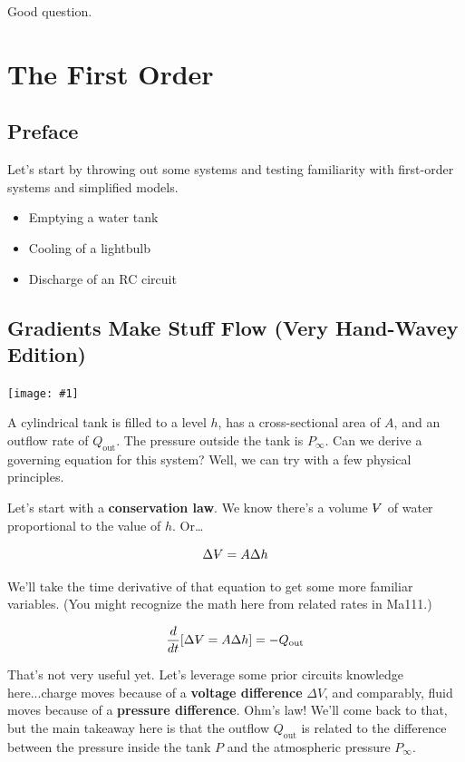 \documentclass{report}
\newcommand{\Volume}{{\ooalign{\hfil$V$\hfil\cr\kern0.08em--\hfil\cr}}}
\newcommand{\bicture}[1]{
\begin{center}
    {\texttt{[image: \#1]}}
\end{center}}
\begin{document}
\begin{onehalfspacing}
\begin{flushleft}
Good question.

\pagebreak

\chapter{The First Order}

\section*{Preface}

Let's start by throwing out some systems and testing familiarity with first-order systems and simplified models.
\begin{itemize}[noitemsep,topsep=0.5pt]
    \item Emptying a water tank
    \item Cooling of a lightbulb
    \item Discharge of an RC circuit
\end{itemize}

\section{Gradients Make Stuff Flow (Very Hand-Wavey Edition)}

\bicture{1_sys1}

A cylindrical tank is filled to a level \(h\), has a cross-sectional area of \(A\), and an outflow rate of \(Q_\text{out}\). The pressure outside the tank is \(P_{\infty}\). Can we derive a governing equation for this system? Well, we can try with a few physical principles.

\medskip

Let's start with a \textbf{conservation law}. We know there's a volume \(\Volume\) of water proportional to the value of \(h\). Or\dots

\vspace{-0.1in}
\[\Delta \Volume = A \Delta h\]

We'll take the time derivative of that equation to get some more familiar variables. (You might recognize the math here from related rates in Ma111.)

\vspace{-0.1in}
\[\frac{d}{dt} \qty[\Delta \Volume = A \Delta h] = -Q_\text{out}\]

That's not very useful yet. Let's leverage some prior circuits knowledge here...charge moves because of a \textbf{voltage difference} \(\Delta V\), and comparably, fluid moves because of a \textbf{pressure difference}. Ohm's law! We'll come back to that, but the main takeaway here is that the outflow \(Q_\text{out}\) is related to the difference between the pressure inside the tank \(P\) and the atmospheric pressure \(P_\infty\).


\end{flushleft}
\end{onehalfspacing}
\end{document}
